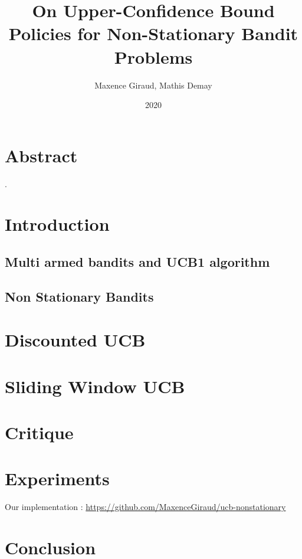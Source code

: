 \documentclass{article}
\title{On Upper-Confidence Bound Policies for Non-Stationary Bandit Problems}
\author{Maxence Giraud, Mathis Demay}
\date{2020}
\begin{document}
\maketitle

\section*{Abstract}
\cite{garivier2008upperconfidence}.

\section{Introduction}

\subsection{Multi armed bandits and UCB1 algorithm}



\subsection{Non Stationary Bandits}

\section{Discounted UCB}


\section{Sliding Window UCB}



\section{Critique}

\section{Experiments}
Our implementation : \url{https://github.com/MaxenceGiraud/ucb-nonstationary} 

\section{Conclusion}


\end{document}
